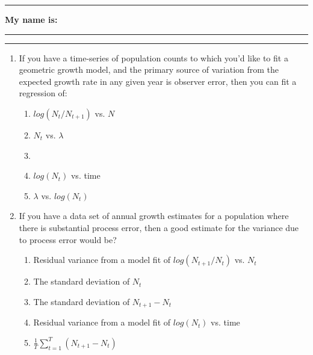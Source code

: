 \documentclass{article}
\newcommand*{\blanks}[1][4em]{\rule{#1}{.4pt}}
\begin{document}
\noindent{}

\rule[0.5ex]{\linewidth}{1pt}
\begin{center}
	\textbf{My name is:} \blanks[150pt]
\end{center}
\rule[0.5ex]{\linewidth}{1pt}

\begin{enumerate}
\item If you have a time-series of population counts to which you'd like to fit a geometric growth model, and the primary source of variation from the expected growth rate in any given year is observer error, then you can fit a regression of: 
\begin{enumerate}
	\item $log \left( N_t / N_{t+1} \right)$ vs. $N$
	\item $N_t$ vs. $\lambda$
	\item {}
	\item $log (N_t)$ vs. time
	\item $\lambda$ vs. $log (N_t)$
\end{enumerate}

\item If you have a data set of annual growth estimates for a population where there is substantial process error, then a good estimate for the variance due to process error would be?
\begin{enumerate}
	\item Residual variance from a model fit of $log(N_{t+1}/N_t)$ vs. $N_t$
	\item The standard deviation of $N_t$
	\item The standard deviation of $N_{t+1}-N_t$
	\item Residual variance from a model fit of $log(N_t)$ vs. time
	\item $\frac{1}{T}\sum_{t=1}^T\left( N_{t+1}-N_t \right)$
\end{enumerate}

\end{enumerate}
\vspace{1cm}
\end{document}
